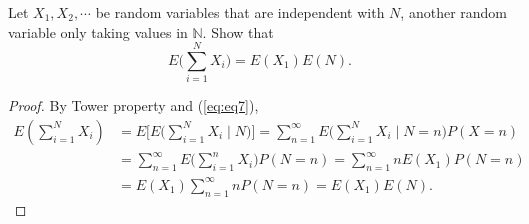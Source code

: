 \documentclass[11pt,singlecolumn, openany, citestyle=authoryear]{elegantbook}
\begin{document}
\begin{CJK}{UTF8}{gbsn}
\begin{example}
    Let $X_1,X_2,\cdots$ be random variables that are independent with $N$, another 
    random variable only taking values in $\mathbb{N}$. Show that 
    $$
    E\big(\sum_{i=1}^N X_i\big) = E(X_1)E(N).
    $$
\end{example}
\begin{proof}
    By Tower property and (\ref{eq:eq7}), 
    \begin{align*}
        E(\sum_{i=1}^N X_i) &= E\biggl[
            E\biggl(\sum_{i=1}^N X_i \mid N\biggr) 
        \biggr]=
        \sum_{n=1}^\infty E\biggl(\sum_{i=1}^N X_i \mid N=n\biggr) P(X=n)\\
        &= \sum_{n=1}^\infty E\biggl(\sum_{i=1}^n X_i \biggr)P(N=n) = 
        \sum_{n=1}^\infty nE(X_1)P(N=n)\\
        &= E(X_1)\sum_{n=1}^\infty nP(N=n)=E(X_1)E(N). 
    \end{align*}
\end{proof}


\end{CJK}
\end{document}
